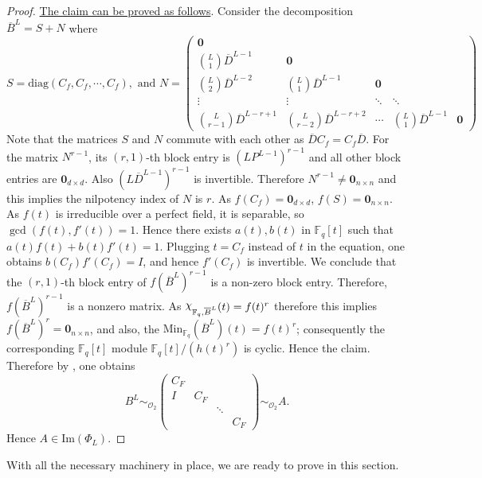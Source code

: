 \documentclass[11pt,twoside]{amsart}
\newcommand{\im}{\mathrm{Im}}
\newcommand{\upchi}{\raisebox{0.4ex}{$\chi$}}
\newcommand{\Char}{\upchi}
\newcommand{\R}{\mathscr{O}_2}
\newcommand{\Fq}{\mathbb{F}_q}
\theoremstyle{definition} %
\begin{document}
\begin{proof}
\ul{The claim can be proved as follows}.
Consider the decomposition $\overline{B}^L= S+N$ where $$S=\mathrm{diag}(C_f,C_f,\cdots,C_f),\text{ and }N=\begin{pmatrix} 
\mathbf 0 &        &        &        &        \\ 
\binom{L}{1}\overline{D}^{L-1} & \mathbf 0 &        &        &        \\ 
\binom{L}{2}\overline{D}^{L-2} & \binom{L}{1}\overline{D}^{L-1} & \mathbf 0 &        &        \\ 
\vdots & \vdots & \ddots & \ddots &        \\ 
\binom{L}{r-1}\overline{D}^{L-r+1} & \binom{L}{r-2}\overline{D}^{L-r+2} & \cdots & \binom{L}{1}\overline{D}^{L-1} & \mathbf 0 
\end{pmatrix}$$
Note that the matrices $S$ and $N$ commute with each other as $\overline{D}C_f=C_f\overline{D}$. 
For the matrix $N^{r-1}$, its $(r,1)$-th block entry is $(LP^{L-1})^{r-1}$ and all other block entries are $\mathbf0_{d\times d}$.
Also $(L\overline{D}^{L-1})^{r-1}$ is invertible.
Therefore $N^{r-1}\neq \mathbf 0_{n\times n}$ and this implies the nilpotency index of $N$ is $r$. 
As $f(C_f)=\mathbf0_{d\times d}$, $f(S)=\mathbf 0_{n\times n}$.
As $f(t)$ is irreducible over a perfect field, it is separable, so $\gcd(f(t),f'(t))=1$. 
Hence there exists $a(t),b(t)$ in $\Fq[t]$ such that $a(t)f(t)+b(t)f'(t)=1$. 
Plugging $t=C_f$ instead of $t$ in the equation, one obtains $b(C_f)f'(C_f)=I$, and hence $f'(C_f)$ is invertible.
We conclude that the $(r,1)$-th block entry of $f(\overline{B}^L)^{r-1}$ is a non-zero block entry.
Therefore, $f(\overline{B}^L)^{r-1}$ is a nonzero matrix. 
As $\Char_{\Fq,{\overline{B}^L}}(t)=f(t)^r$ therefore this implies $f(\overline{B}^L)^r=\mathbf 0_{n\times n}$, and also, the $\mathrm{Min}_{\Fq}(\overline{B}^L)(t)=f(t)^r$; consequently the corresponding $\mathbb{F}_q[t]$ module $\mathbb{F}_q[t]/(h(t)^r)$ is cyclic. Hence the claim.
Therefore by , one obtains $$B^L\sim_{\R} \begin{pmatrix}
C_F &  &   &      \\
 I & C_F &  &      \\
  &   & \ddots &     \\
  &   &   & C_F 
\end{pmatrix}\sim_{\R} A.$$
Hence $A\in \im(\Phi_L)$.
\end{proof}
With all the necessary machinery in place, we are ready to prove  in this section.
\theoremtwo*
\end{document}
